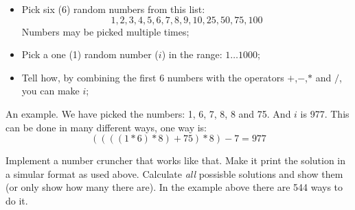 \begin{Exercise}[title={Number cruncher},difficulty=9]
\label{ex:numbercruncher}
\begin{itemize}
\item{Pick six (6) random numbers from this list:
$$1, 2, 3, 4, 5, 6, 7, 8, 9, 10, 25, 50, 75, 100$$
Numbers may be picked multiple times;}
\item{Pick a one (1) random number ($i$) in the range: $1 \ldots 1000$;}
\item{Tell how, by combining the first 6 numbers with the operators
$+$,$-$,$*$ and $/$, you can make $i$;}
\end{itemize}
An example. We have picked the numbers: 1, 6, 7, 8, 8 and 75. And $i$ is
977. This can be done in many different ways, one way is:
$$ ((((1 * 6) * 8) + 75) * 8) - 7 = 977$$

\Question\label{ex:cruncher q1}
Implement a number cruncher that works like that. Make it print the
solution in a simular format as used above.
\Question\label{ex:cruncher q2}
Calculate \emph{all} possisble solutions and show them (or only show how
many there are). In the example above there are 544 ways to do it.
\end{Exercise}

\begin{Answer}
\Question 
\end{Answer}

